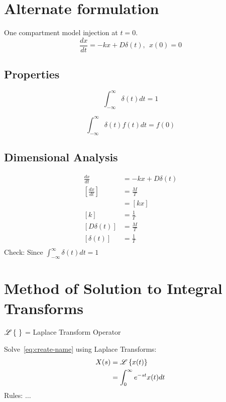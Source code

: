\documentclass[
	date={September 11{,} 2024}
]{math486notes}
\begin{document}
\section{Alternate formulation}\label{sec:alternate-formulation}
One compartment model injection at $t=0$.
\begin{equation}
	\frac{dx}{dt} = -kx + D\delta(t),\ \ x(0) = 0
	\label{eq:create-name}
\end{equation}

\subsection{Properties}\label{subsec:properties}
\begin{equation}
	\int_{-\infty}^{\infty} \delta(t) dt = 1
	\label{eq:delta-dirac-1}
\end{equation}

\begin{equation}
	\int_{-\infty}^{\infty} \delta(t)f(t) dt = f(0)
	\label{eq:delta-dirac-2}
\end{equation}

\subsection{Dimensional Analysis}\label{subsec:dimensional-analysis}
\begin{equation*}
\begin{aligned}
	\frac{dx}{dt} &= -kx + D\delta(t)\\
	\left[ \frac{dx}{dt} \right] &= \frac{M}{T}\\
	&= [kx]\\
	[k] &= \frac{1}{T}\\
	[D\delta(t)] &= \frac{M}{T}\\
	[\delta(t)] &= \frac{1}{T}\\
\end{aligned}
\end{equation*}
Check: Since $\int_{-\infty}^{\infty} \delta(t)dt = 1$

\section{Method of Solution to Integral Transforms}\label{sec:method-of-solution-to-integral-transforms}
$\laplace[~]$ = Laplace Transform Operator

Solve~\eqref{eq:create-name} using Laplace Transforms:
\begin{equation*}
\begin{aligned}
	X(s) &= \laplace[x(t)]\\
		 &= \int_{0}^{\infty} e^{-st} x(t)dt
\end{aligned}
\end{equation*}
Rules:
$\dots$
\end{document}
